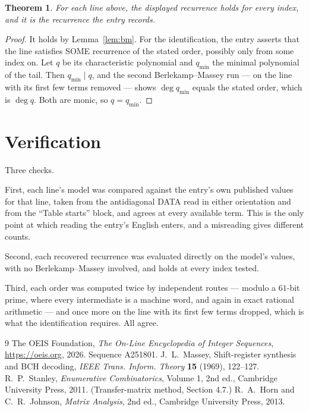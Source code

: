 \documentclass[11pt,a4paper]{article}
\theoremstyle{plain}
\newtheorem{theorem}{Theorem}
\theoremstyle{definition}
\begin{document}
\begin{theorem}
For each line above, the displayed recurrence holds for every index, and it is the recurrence
the entry records.
\end{theorem}

\begin{proof}
It holds by Lemma~\ref{lem:bm}. For the identification, the entry asserts that the line
satisfies SOME recurrence of the stated order, possibly only from some index on. Let $q$ be its
characteristic polynomial and $q_{\min}$ the minimal polynomial of the tail. Then
$q_{\min}\mid q$, and the second Berlekamp--Massey run --- on the line with its first few
terms removed --- shows $\deg q_{\min}$ equals the stated order, which is $\deg q$. Both are
monic, so $q=q_{\min}$.
\end{proof}

\section{Verification}

Three checks.

First, each line's model was compared against the entry's own published values for that line,
taken from the antidiagonal DATA read in either orientation and from the ``Table starts''
block, and agrees at every available term. This is the only point at which reading the entry's
English enters, and a misreading gives different counts.

Second, each recovered recurrence was evaluated directly on the model's values, with no
Berlekamp--Massey involved, and holds at every index tested.

Third, each order was computed twice by independent routes --- modulo a $61$-bit prime, where
every intermediate is a machine word, and again in exact rational arithmetic --- and once more
on the line with its first few terms dropped, which is what the identification requires. All
agree.

\begin{thebibliography}{9}
 The OEIS Foundation, \emph{The On-Line Encyclopedia of Integer
Sequences}, \url{https://oeis.org}, 2026. Sequence A251801.
 J.~L.~Massey, Shift-register synthesis and BCH decoding, \emph{IEEE
Trans. Inform. Theory} \textbf{15} (1969), 122--127.
 R.~P.~Stanley, \emph{Enumerative Combinatorics}, Volume 1, 2nd ed.,
Cambridge University Press, 2011. (Transfer-matrix method, Section 4.7.)
 R.~A.~Horn and C.~R.~Johnson, \emph{Matrix Analysis}, 2nd ed., Cambridge
University Press, 2013.
\end{thebibliography}
\end{document}
